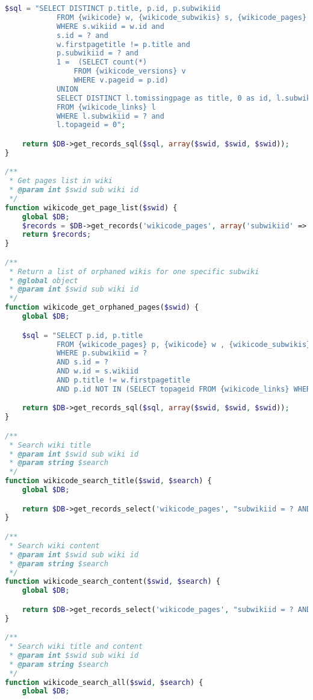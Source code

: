 \begin{lstlisting}[language=PHP]
    $sql = "SELECT DISTINCT p.title, p.id, p.subwikiid
            FROM {wikicode} w, {wikicode_subwikis} s, {wikicode_pages} p
            WHERE s.wikiid = w.id and
            s.id = ? and
            w.firstpagetitle != p.title and
            p.subwikiid = ? and
            1 =  (SELECT count(*)
                FROM {wikicode_versions} v
                WHERE v.pageid = p.id)
            UNION
            SELECT DISTINCT l.tomissingpage as title, 0 as id, l.subwikiid
            FROM {wikicode_links} l
            WHERE l.subwikiid = ? and
            l.topageid = 0";

    return $DB->get_records_sql($sql, array($swid, $swid, $swid));
}

/**
 * Get pages list in wiki
 * @param int $swid sub wiki id
 */
function wikicode_get_page_list($swid) {
    global $DB;
    $records = $DB->get_records('wikicode_pages', array('subwikiid' => $swid), 'title ASC');
    return $records;
}

/**
 * Return a list of orphaned wikis for one specific subwiki
 * @global object
 * @param int $swid sub wiki id
 */
function wikicode_get_orphaned_pages($swid) {
    global $DB;

    $sql = "SELECT p.id, p.title
            FROM {wikicode_pages} p, {wikicode} w , {wikicode_subwikis} s
            WHERE p.subwikiid = ?
            AND s.id = ?
            AND w.id = s.wikiid
            AND p.title != w.firstpagetitle
            AND p.id NOT IN (SELECT topageid FROM {wikicode_links} WHERE subwikiid = ?);";

    return $DB->get_records_sql($sql, array($swid, $swid, $swid));
}

/**
 * Search wiki title
 * @param int $swid sub wiki id
 * @param string $search
 */
function wikicode_search_title($swid, $search) {
    global $DB;

    return $DB->get_records_select('wikicode_pages', "subwikiid = ? AND title LIKE ?", array($swid, '%'.$search.'%'));
}

/**
 * Search wiki content
 * @param int $swid sub wiki id
 * @param string $search
 */
function wikicode_search_content($swid, $search) {
    global $DB;

    return $DB->get_records_select('wikicode_pages', "subwikiid = ? AND cachedcontent LIKE ?", array($swid, '%'.$search.'%'));
}

/**
 * Search wiki title and content
 * @param int $swid sub wiki id
 * @param string $search
 */
function wikicode_search_all($swid, $search) {
    global $DB;


\end{lstlisting}
